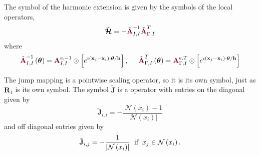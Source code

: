 The symbol of the harmonic extension is given by the symbols of the local operators,
\begin{equation}
\tilde{\boldsymbol{\mathcal{H}}} = - \tilde{{\color{burgundy}\mathbf{A}}}_{I, I}^{-1} \tilde{{\color{burgundy}\mathbf{A}}}_{\Gamma, I}^T
\end{equation}
where
\begin{equation}
\tilde{{\color{burgundy}\mathbf{A}}}_{I, I}^{-1} \left( \boldsymbol{\theta} \right) = {\color{burgundy}\mathbf{A}}_{I, I}^{e, -1} \odot \left[ e^{\imath \left( \mathbf{x}_j - \mathbf{x}_i \right) \cdot \boldsymbol{\theta} / \mathbf{h}} \right],
\hspace{5mm}
\tilde{{\color{burgundy}\mathbf{A}}}_{\Gamma, I}^T \left( \boldsymbol{\theta} \right) = {\color{burgundy}\mathbf{A}}_{\Gamma, I}^{e, T} \odot \left[ e^{\imath \left( \mathbf{x}_j - \mathbf{x}_i \right) \cdot \boldsymbol{\theta} / \mathbf{h}} \right]
\end{equation}

The jump mapping is a pointwise scaling operator, so it is its own symbol, just as $\mathbf{R}_1$ is its own symbol.
The symbol $\tilde{\mathbf{J}}$ is a operator with entries on the diagonal given by
\begin{equation}
\tilde{\mathbf{J}}_{i, i} = - \frac{\lvert \mathcal{N} \left( x_i \right) - 1}{\lvert \mathcal{N} \left( x_i \right) \rvert}
\end{equation}
and off diagonal entries given by
\begin{equation}
\tilde{\mathbf{J}}_{i, j} = - \frac{1}{\lvert \mathcal{N} \left( x_i \right) \rvert} \hspace{2mm} \text{if} \hspace{2mm} x_j \in \mathcal{N} \left( x_i \right).
\end{equation}

